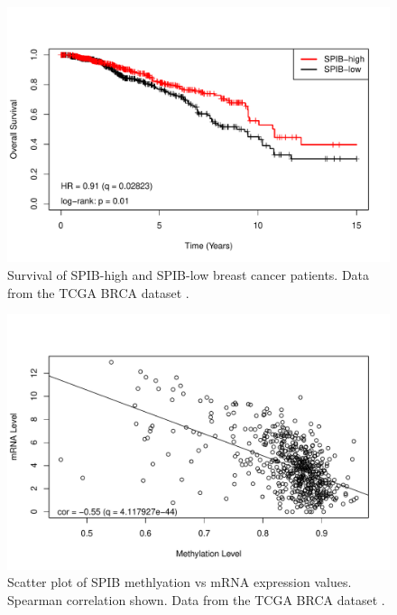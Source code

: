 \begin{figure}[!p]
    \centering
    \includegraphics[scale=0.70]{figures/km_plot.pdf}
    \caption{Survival of SPIB-high and SPIB-low breast cancer patients. Data from the TCGA BRCA dataset \cite{Ciriello2015, Goldman2018}.}
    \label{km_plot}
\end{figure} 
\clearpage
\begin{figure}[!p]
    \centering
    \includegraphics[scale=0.75]{figures/methylation.pdf}
    \caption{Scatter plot of SPIB methlyation vs mRNA expression values. Spearman correlation shown. Data from the TCGA BRCA dataset \cite{Ciriello2015, Goldman2018}.}
    \label{methylation}
\end{figure} 
\clearpage
